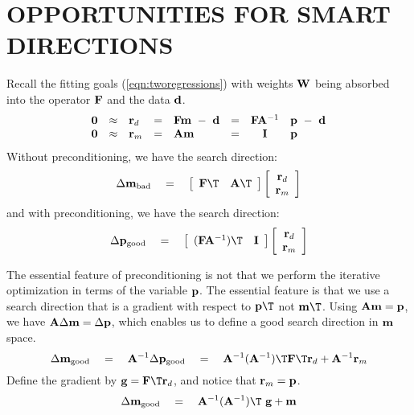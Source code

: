\section{OPPORTUNITIES FOR SMART DIRECTIONS}
Recall the fitting goals (\ref{eqn:tworegressions})
with weights $\bold W$
being absorbed into the operator $\bold F$ and the data $\bold d$.
\begin{equation}
\begin{array}{llllllcl}
\bold 0 &\approx& \bold r_d &=&  \bold F \bold m \ -\  \bold d   &=&
    \bold F  \bold A^{-1} &\bold p  \ -\  \bold d
    \\
\bold 0 &\approx& \bold r_m &=&  \bold A \bold m       &=&
    \bold I        & \bold p
\end{array}
\label{eqn:precsummary2}
\end{equation}
Without preconditioning, we have the search direction:
\begin{equation}
\Delta \bold m_{\rm bad} \eq
\left[
	\begin{array}{cc}
	\bold F\T & \bold A\T
	\end{array}
\right]
\left[
	\begin{array}{c}
	\bold r_d \\
	\bold r_m
	\end{array}
\right]
\end{equation}
and with preconditioning, we have the search direction:
\begin{equation}
\Delta \bold p_{\rm good} \eq
\left[
	\begin{array}{cc}
	(\bold F\bold A^{-1})\T & \bold I
	\end{array}
\right]
\left[
	\begin{array}{c}
	\bold r_d \\
	\bold r_m
	\end{array}
\right]
\end{equation}
\par
The essential feature of preconditioning is not that we perform
the iterative optimization in terms of the variable $\bold p$.
The essential feature is that we use a search direction
that is a gradient with respect to $\bold p\T$ not $\bold m\T$.
Using $\bold A\bold m=\bold p$, we have
$\bold A\Delta \bold m=\Delta \bold p$,
which enables us to define a good search direction in $\bold m$ space.
\begin{equation}
\Delta \bold m_{\rm good} \eq \bold A^{-1}
\Delta \bold p_{\rm good} \eq
	\bold A^{-1} (\bold A^{-1})\T
	\bold F\T \bold r_d + \bold  A^{-1} \bold r_m
\end{equation}
Define the gradient by $\bold g=\bold F\T\bold r_d$, and
notice that $\bold r_m=\bold p$.
\begin{equation}
\Delta \bold m_{\rm good} \eq
	\bold A^{-1} (\bold A^{-1})\T \ \bold g
	+ \bold m
\label{eqn:newdirection}
\end{equation}

